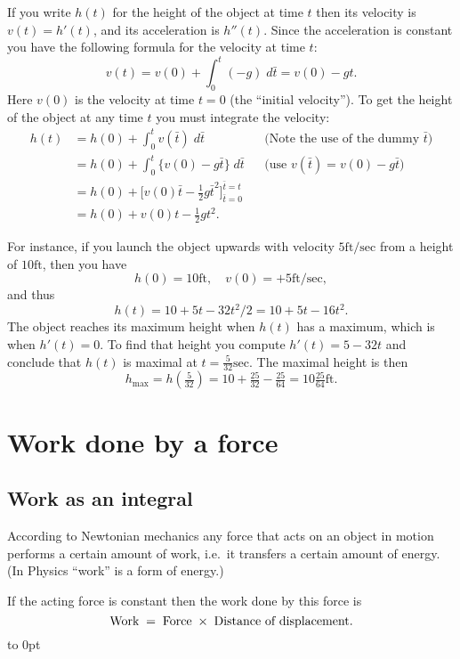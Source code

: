 If you write $h(t)$ for the height of the object at time $t$ then its velocity
is $v(t) = h'(t)$, and its acceleration is $h''(t)$.  Since the acceleration is
constant you have the following formula for the velocity at time $t$:
\[
v(t) = v(0) + \int_0^t (-g)\; d\bar t = v(0)-gt.
\]
Here $v(0)$ is the velocity at time $t=0$ (the ``initial velocity'').  To get
the height of the object at any time $t$ you must integrate the velocity:
\marginpar{\footnotesize%
}
\begin{align*}
  h(t) &= h(0) + \int_{0}^t v(\bar t)\;d\bar t
  &&\text{(Note the use of the dummy $\bar t$)}\\
  &=h(0) + \int_0^t \bigl\{v(0) - g \bar t\bigr\}\;d\bar t
  &&\text{(use $v(\bar t) = v(0)-g\bar t$)}\\
  &=h(0) + \bigl[v(0)\bar t -\tfrac12 g \bar t^2\bigr]_{\bar t=0}^{\bar t=t}\\
  &=h(0) + v(0) t -\tfrac12gt^2.
\end{align*}

For instance, if you launch the object upwards with velocity
$5\textrm{ft}/\textrm{sec}$ from a height of $10\textrm{ft}$, then you have
\[
h(0) = 10\textrm{ft},\quad v(0) = +5\textrm{ft}/\textrm{sec},
\]
and thus
\[
h(t) = 10 + 5t-32t^2/2 = 10+5t-16t^2.
\]
The object reaches its maximum height when $h(t)$ has a maximum, which is when
$h'(t)=0$.  To find that height you compute $h'(t) = 5-32t$ and conclude that
$h(t)$ is maximal at $t=\frac{5}{32}\textrm{sec}$.  The maximal height is then
\[
h_{\textrm{max}} = h(\tfrac5{32}) = 10+\tfrac{25}{32}-\tfrac{25}{64}=
10\tfrac{25}{64}\textrm{ft}.
\]



\section{Work done by a force}

\subsection{Work as an integral}
According to  Newtonian mechanics any force that acts on an object in motion
performs a certain amount of work, i.e.\ it transfers a certain amount of
energy.  (In Physics ``work'' is a form of energy.)

If the acting force is constant then the work done by this force is
\[
\hbox{Work} \;=\; \hbox{Force}\;\times\;\hbox{Distance of displacement}.
\]
\vbox to 0pt{\centering\footnotesize\sffamily\itshape%
   }

